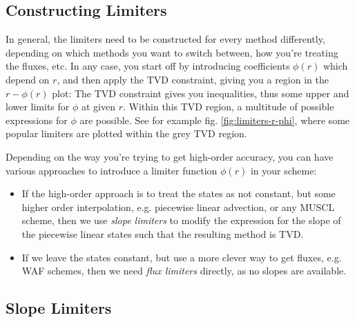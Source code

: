 \subsection{Constructing Limiters}


In general, the limiters need to be constructed for every method differently, depending on which methods you want to switch between, how you're treating the fluxes, etc.
In any case, you start off by introducing coefficients $\phi(r)$ which depend on $r$, and then apply the TVD constraint, giving you a region in the $r-\phi(r)$ plot:
The TVD constraint gives you inequalities, thus some upper and lower limits for $\phi$ at given $r$.
Within this TVD region, a multitude of possible expressions for $\phi$ are possible.
See for example fig. \ref{fig:limiters-r-phi}, where some popular limiters are plotted within the grey TVD region.



Depending on the way you're trying to get high-order accuracy, you can have various approaches to introduce a limiter function $\phi(r)$ in your scheme:

\begin{itemize}
	\item 	If the high-order approach is to treat the states as not constant, but some higher order interpolation, e.g. piecewise linear advection, or any MUSCL scheme, then we use \emph{slope limiters} to modify the expression for the slope of the piecewise linear states such that the resulting method is TVD.
	\item 	If we leave the states constant, but use a more clever way to get fluxes, e.g. WAF schemes, then we need \emph{flux limiters} directly, as no slopes are available.
\end{itemize}

















\subsection{Slope Limiters}\label{chap:slope_limiters}



